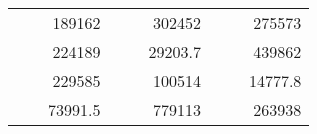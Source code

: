 \begin{table}[]
\begin{tabular}{|ccrccrccc}
\rowcolor[HTML]{DAE8FC} 
\multicolumn{1}{|c|}{\cellcolor[HTML]{FFFFC7}}                                & \multicolumn{1}{c|}{\cellcolor[HTML]{DAE8FC}}                      & \multicolumn{1}{r|}{\cellcolor[HTML]{DAE8FC}189162}    & \multicolumn{1}{c|}{\cellcolor[HTML]{FFFFC7}}                                & \multicolumn{1}{c|}{\cellcolor[HTML]{DAE8FC}}                       & \multicolumn{1}{r|}{\cellcolor[HTML]{DAE8FC}302452}    & \multicolumn{1}{c|}{\cellcolor[HTML]{FFFFC7}}                                & \multicolumn{1}{c|}{\cellcolor[HTML]{DAE8FC}}                      & \multicolumn{1}{r|}{\cellcolor[HTML]{DAE8FC}275573}    \\ \cline{3-3} \cline{6-6} \cline{9-9} 
\multicolumn{1}{|c|}{\cellcolor[HTML]{FFFFC7}}                                & \multicolumn{1}{c|}{\cellcolor[HTML]{DAE8FC}}                      & \multicolumn{1}{r|}{\cellcolor[HTML]{DDFDFF}224189}    & \multicolumn{1}{c|}{\cellcolor[HTML]{FFFFC7}}                                & \multicolumn{1}{c|}{\cellcolor[HTML]{DAE8FC}}                       & \multicolumn{1}{r|}{\cellcolor[HTML]{DDFDFF}29203.7}   & \multicolumn{1}{c|}{\cellcolor[HTML]{FFFFC7}}                                & \multicolumn{1}{c|}{\cellcolor[HTML]{DAE8FC}}                      & \multicolumn{1}{r|}{\cellcolor[HTML]{DDFDFF}439862}    \\ \cline{3-3} \cline{6-6} \cline{9-9} 
\rowcolor[HTML]{DAE8FC} 
\multicolumn{1}{|c|}{\cellcolor[HTML]{FFFFC7}}                                & \multicolumn{1}{c|}{\cellcolor[HTML]{DAE8FC}}                      & \multicolumn{1}{r|}{\cellcolor[HTML]{DAE8FC}229585}    & \multicolumn{1}{c|}{\cellcolor[HTML]{FFFFC7}}                                & \multicolumn{1}{c|}{\cellcolor[HTML]{DAE8FC}}                       & \multicolumn{1}{r|}{\cellcolor[HTML]{DAE8FC}100514}    & \multicolumn{1}{c|}{\cellcolor[HTML]{FFFFC7}}                                & \multicolumn{1}{c|}{\cellcolor[HTML]{DAE8FC}}                      & \multicolumn{1}{r|}{\cellcolor[HTML]{DAE8FC}14777.8}   \\ \cline{3-3} \cline{6-6} \cline{9-9} 
\multicolumn{1}{|c|}{\cellcolor[HTML]{FFFFC7}}                                & \multicolumn{1}{c|}{\cellcolor[HTML]{DAE8FC}}                      & \multicolumn{1}{r|}{\cellcolor[HTML]{DDFDFF}73991.5}   & \multicolumn{1}{c|}{\cellcolor[HTML]{FFFFC7}}                                & \multicolumn{1}{c|}{\cellcolor[HTML]{DAE8FC}}                       & \multicolumn{1}{r|}{\cellcolor[HTML]{DDFDFF}779113}    & \multicolumn{1}{c|}{\cellcolor[HTML]{FFFFC7}}                                & \multicolumn{1}{c|}{\cellcolor[HTML]{DAE8FC}}                      & \multicolumn{1}{r|}{\cellcolor[HTML]{DDFDFF}263938}    \\ \cline{3-3} \cline{6-6} \cline{9-9} 

\end{tabular}
\end{table}

